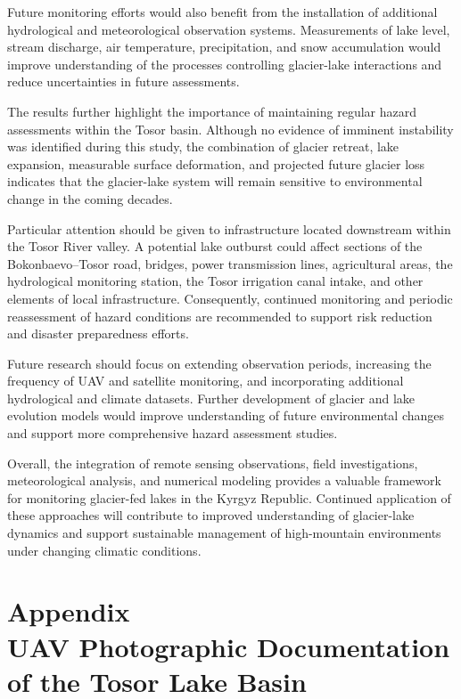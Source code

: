 \documentclass[12pt,a4paper]{report}
\begin{document}
Future monitoring efforts would also benefit from the installation of additional hydrological and meteorological observation systems. Measurements of lake level, stream discharge, air temperature, precipitation, and snow accumulation would improve understanding of the processes controlling glacier-lake interactions and reduce uncertainties in future assessments.

The results further highlight the importance of maintaining regular hazard assessments within the Tosor basin. Although no evidence of imminent instability was identified during this study, the combination of glacier retreat, lake expansion, measurable surface deformation, and projected future glacier loss indicates that the glacier-lake system will remain sensitive to environmental change in the coming decades.

Particular attention should be given to infrastructure located downstream within the Tosor River valley. A potential lake outburst could affect sections of the Bokonbaevo–Tosor road, bridges, power transmission lines, agricultural areas, the hydrological monitoring station, the Tosor irrigation canal intake, and other elements of local infrastructure. Consequently, continued monitoring and periodic reassessment of hazard conditions are recommended to support risk reduction and disaster preparedness efforts.

Future research should focus on extending observation periods, increasing the frequency of UAV and satellite monitoring, and incorporating additional hydrological and climate datasets. Further development of glacier and lake evolution models would improve understanding of future environmental changes and support more comprehensive hazard assessment studies.

Overall, the integration of remote sensing observations, field investigations, meteorological analysis, and numerical modeling provides a valuable framework for monitoring glacier-fed lakes in the Kyrgyz Republic. Continued application of these approaches will contribute to improved understanding of glacier-lake dynamics and support sustainable management of high-mountain environments under changing climatic conditions.

\printbibliography[
    heading=bibintoc,
    title={Bibliography},
    resetnumbers=true
]


\appendix
{}

\chapter*{%
Appendix \thechapter\\[1ex]
UAV Photographic Documentation of the Tosor Lake Basin}
\end{document}
